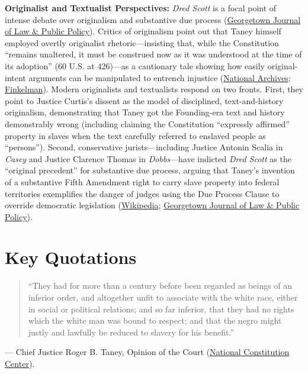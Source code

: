 \documentclass[12pt]{article}
\begin{document}
\textbf{Originalist and Textualist Perspectives:} \textit{Dred Scott} is a focal point of intense debate over originalism and substantive due process (\href{https://www.law.georgetown.edu/public-policy-journal/wp-content/uploads/sites/23/2018/10/16-2-Dred-Scott-Roe.pdf}{Georgetown Journal of Law \& Public Policy}). Critics of originalism point out that Taney himself employed overtly originalist rhetoric---insisting that, while the Constitution ``remains unaltered, it must be construed now as it was understood at the time of its adoption'' (60 U.S. at 426)---as a cautionary tale showing how easily original-intent arguments can be manipulated to entrench injustice (\href{https://www.archives.gov/milestone-documents/dred-scott-v-sandford}{National Archives}; \href{https://studentorgs.kentlaw.iit.edu/cklawreview/wp-content/uploads/sites/3/vol82no1/Finkelman.pdf}{Finkelman}). Modern originalists and textualists respond on two fronts. First, they point to Justice Curtis's dissent as the model of disciplined, text-and-history originalism, demonstrating that Taney got the Founding-era text and history demonstrably wrong (including claiming the Constitution ``expressly affirmed'' property in slaves when the text carefully referred to enslaved people as ``persons''). Second, conservative jurists---including Justice Antonin Scalia in \textit{Casey} and Justice Clarence Thomas in \textit{Dobbs}---have indicted \textit{Dred Scott} as the ``original precedent'' for substantive due process, arguing that Taney's invention of a substantive Fifth Amendment right to carry slave property into federal territories exemplifies the danger of judges using the Due Process Clause to override democratic legislation (\href{https://en.wikipedia.org/wiki/Dred_Scott_v._Sandford}{Wikipedia}; \href{https://www.law.georgetown.edu/public-policy-journal/wp-content/uploads/sites/23/2018/10/16-2-Dred-Scott-Roe.pdf}{Georgetown Journal of Law \& Public Policy}).

\section{Key Quotations}

\begin{quote}
``They had for more than a century before been regarded as beings of an inferior order, and altogether unfit to associate with the white race, either in social or political relations; and so far inferior, that they had no rights which the white man was bound to respect; and that the negro might justly and lawfully be reduced to slavery for his benefit.''
\end{quote}
\noindent --- Chief Justice Roger B. Taney, Opinion of the Court (\href{https://constitutioncenter.org/the-constitution/supreme-court-case-library/dred-scott-v-sandford}{National Constitution Center}).
\end{document}
